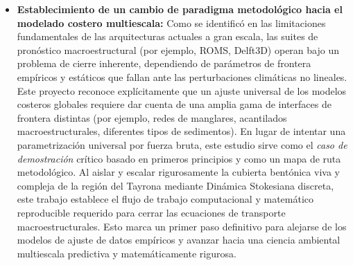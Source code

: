 \begin{itemize}
    \item \textbf{Establecimiento de un cambio de paradigma metodológico hacia el modelado costero multiescala:} Como se identificó en las limitaciones fundamentales de las arquitecturas actuales a gran escala, las suites de pronóstico macroestructural (por ejemplo, ROMS, Delft3D) operan bajo un problema de cierre inherente, dependiendo de parámetros de frontera empíricos y estáticos que fallan ante las perturbaciones climáticas no lineales. Este proyecto reconoce explícitamente que un ajuste universal de los modelos costeros globales requiere dar cuenta de una amplia gama de interfaces de frontera distintas (por ejemplo, redes de manglares, acantilados macroestructurales, diferentes tipos de sedimentos). En lugar de intentar una parametrización universal por fuerza bruta, este estudio sirve como el \emph{caso de demostración} crítico basado en primeros principios y como un mapa de ruta metodológico. Al aislar y escalar rigurosamente la cubierta bentónica viva y compleja de la región del Tayrona mediante Dinámica Stokesiana discreta, este trabajo establece el flujo de trabajo computacional y matemático reproducible requerido para cerrar las ecuaciones de transporte macroestructurales. Esto marca un primer paso definitivo para alejarse de los modelos de ajuste de datos empíricos y avanzar hacia una ciencia ambiental multiescala predictiva y matemáticamente rigurosa.
\end{itemize}

